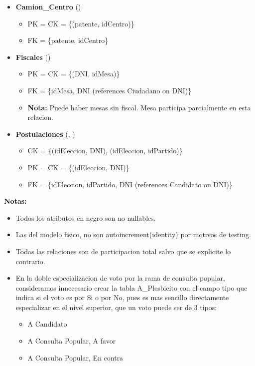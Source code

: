 \begin{itemize}
	
	\item \textbf{Camion\_Centro} () 
	\begin{itemize}
		\item PK = CK = \{(patente, idCentro)\}
		\item FK = \{patente, idCentro\}
	\end{itemize}
	\vspace{1mm}

	\item \textbf{Fiscales} () 
	\begin{itemize}
		\item PK = CK = \{(DNI, idMesa)\}
		\item FK = \{idMesa, DNI  (references Ciudadano on DNI)\}
		\item \textbf{Nota:} Puede haber mesas sin fiscal. Mesa participa parcialmente en esta relacion.
	\end{itemize}
	\vspace{1mm}

	\item \textbf{Postulaciones} (, ) 
	\begin{itemize}
		\item CK = \{(idEleccion, DNI), (idEleccion, idPartido)\}
		\item PK = CK = \{(idEleccion, DNI)\}
		\item FK = \{idEleccion, idPartido, DNI (references Candidato on DNI)\}
	\end{itemize}
	\vspace{1mm}

\end{itemize}

\textbf{Notas:} 
\begin{itemize}
	\item Todos los atributos en negro son no nullables.
	\item Las  del modelo fisico, no son autoincrement(identity) por motivos de testing.
	\item Todas las relaciones son de participacion total salvo que se explicite lo contrario.
	\item En la doble especializacion de voto por la rama de consulta popular, consideramos innecesario crear la tabla A\_Plesbicito con el campo tipo que indica si el voto es por Si o por No, pues es mas sencillo directamente especializar en el nivel superior, que un voto puede ser de 3 tipos:
	\begin{itemize}
		\item A Candidato
		\item A Consulta Popular, A favor
		\item A Consulta Popular, En contra
	\end{itemize}


\end{itemize}



